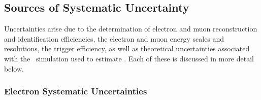 \subsection{Sources of Systematic Uncertainty}

Uncertainties arise due to the determination of
electron and muon reconstruction and identification efficiencies, the electron
and muon energy scales and resolutions, the trigger efficiency, as well as
theoretical uncertainties associated with the \mc\ simulation used to estimate
\CZZ. Each of these is discussed in more detail below.

\subsubsection{Electron Systematic Uncertainties}

